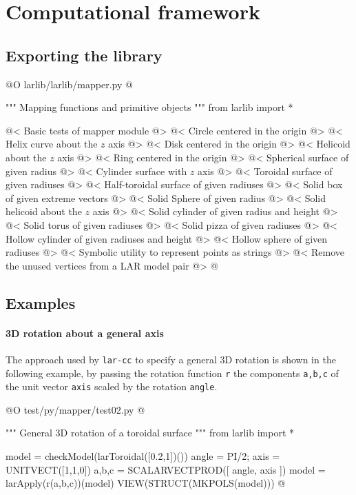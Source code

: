\documentclass[11pt,oneside]{article}	%
\begin{document}
\section{Computational framework}
\subsection{Exporting the library}
@O larlib/larlib/mapper.py
@{""" Mapping functions and primitive objects """
from larlib import *

@< Basic tests of mapper module @>
@< Circle centered in the origin @>
@< Helix curve about the $z$ axis @>
@< Disk centered in the origin @>
@< Helicoid about the $z$ axis @>
@< Ring centered in the origin @>
@< Spherical surface of given radius @>
@< Cylinder surface with $z$ axis @>
@< Toroidal surface of given radiuses @>
@< Half-toroidal surface of given radiuses @>
@< Solid box of given extreme vectors @>
@< Solid Sphere of given radius @>
@< Solid helicoid about the $z$ axis @>
@< Solid cylinder of given radius and height @>
@< Solid torus of given radiuses @>
@< Solid pizza of given radiuses @>
@< Hollow cylinder of given radiuses and height @>
@< Hollow sphere of given radiuses @>
@< Symbolic utility to represent points as strings @>
@< Remove the unused vertices from a LAR model pair @>
@}
\subsection{Examples}

\paragraph{3D rotation about a general axis}
The approach used by \texttt{lar-cc} to specify a general 3D rotation is shown in the following example,
by passing the rotation function \texttt{r} the components \texttt{a,b,c} of the unit vector \texttt{axis} scaled by the rotation \texttt{angle}. 

@O test/py/mapper/test02.py
@{""" General 3D rotation of a toroidal surface """
from larlib import *

model = checkModel(larToroidal([0.2,1])())
angle = PI/2; axis = UNITVECT([1,1,0])
a,b,c = SCALARVECTPROD([ angle, axis ])
model = larApply(r(a,b,c))(model)
VIEW(STRUCT(MKPOLS(model)))
@}
\end{document}
